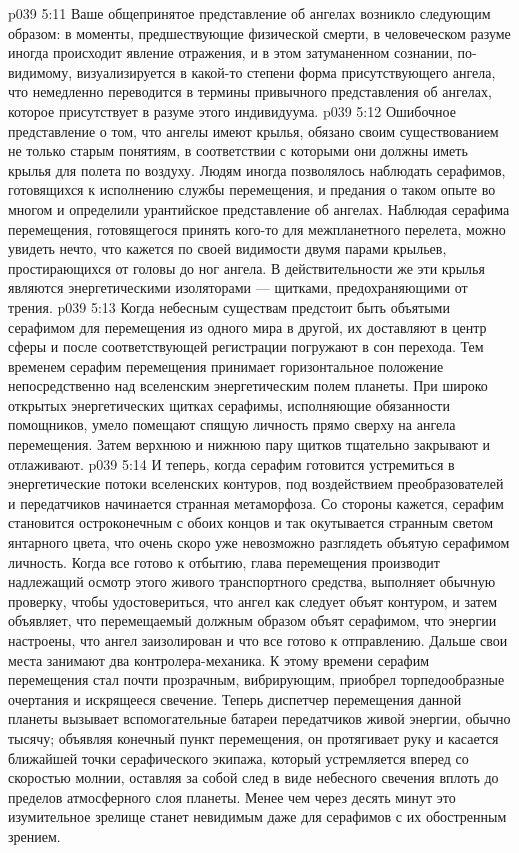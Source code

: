 \vs p039 5:11 \pc Ваше общепринятое представление об ангелах возникло следующим образом: в моменты, предшествующие физической смерти, в человеческом разуме иногда происходит явление отражения, и в этом затуманенном сознании, по\hyp{}видимому, визуализируется в какой\hyp{}то степени форма присутствующего ангела, что немедленно переводится в термины привычного представления об ангелах, которое присутствует в разуме этого индивидуума.
\vs p039 5:12 Ошибочное представление о том, что ангелы имеют крылья, обязано своим существованием не только старым понятиям, в соответствии с которыми они должны иметь крылья для полета по воздуху. Людям иногда позволялось наблюдать серафимов, готовящихся к исполнению службы перемещения, и предания о таком опыте во многом и определили урантийское представление об ангелах. Наблюдая серафима перемещения, готовящегося принять кого\hyp{}то для межпланетного перелета, можно увидеть нечто, что кажется по своей видимости двумя парами крыльев, простирающихся от головы до ног ангела. В действительности же эти крылья являются энергетическими изоляторами --- щитками, предохраняющими от трения.
\vs p039 5:13 \pc Когда небесным существам предстоит быть объятыми серафимом для перемещения из одного мира в другой, их доставляют в центр сферы и после соответствующей регистрации погружают в сон перехода. Тем временем серафим перемещения принимает горизонтальное положение непосредственно над вселенским энергетическим полем планеты. При широко открытых энергетических щитках серафимы, исполняющие обязанности помощников, умело помещают спящую личность прямо сверху на ангела перемещения. Затем верхнюю и нижнюю пару щитков тщательно закрывают и отлаживают.
\vs p039 5:14 И теперь, когда серафим готовится устремиться в энергетические потоки вселенских контуров, под воздействием преобразователей и передатчиков начинается странная метаморфоза. Со стороны кажется, серафим становится остроконечным с обоих концов и так окутывается странным светом янтарного цвета, что очень скоро уже невозможно разглядеть объятую серафимом личность. Когда все готово к отбытию, глава перемещения производит надлежащий осмотр этого живого транспортного средства, выполняет обычную проверку, чтобы удостовериться, что ангел как следует объят контуром, и затем объявляет, что перемещаемый должным образом объят серафимом, что энергии настроены, что ангел заизолирован и что все готово к отправлению. Дальше свои места занимают два контролера\hyp{}механика. К этому времени серафим перемещения стал почти прозрачным, вибрирующим, приобрел торпедообразные очертания и искрящееся свечение. Теперь диспетчер перемещения данной планеты вызывает вспомогательные батареи передатчиков живой энергии, обычно тысячу; объявляя конечный пункт перемещения, он протягивает руку и касается ближайшей точки серафического экипажа, который устремляется вперед со скоростью молнии, оставляя за собой след в виде небесного свечения вплоть до пределов атмосферного слоя планеты. Менее чем через десять минут это изумительное зрелище станет невидимым даже для серафимов с их обостренным зрением.

